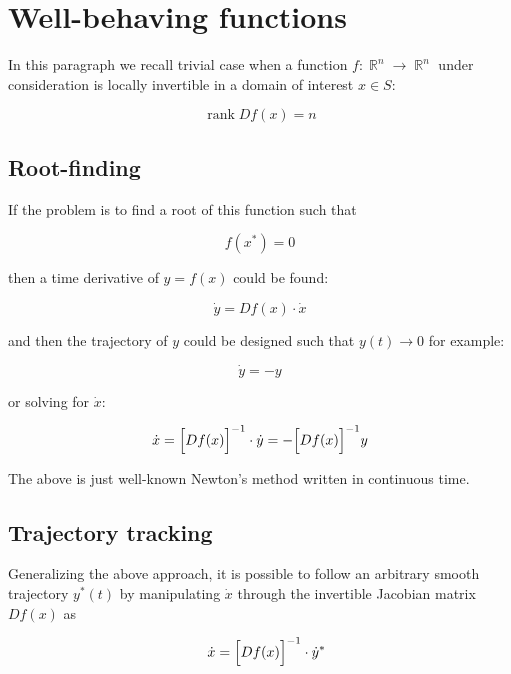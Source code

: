\documentclass[11pt,american]{article}
\DeclareMathOperator{\R}{\mathbb{R}}
\DeclareMathOperator{\rank}{\operatorname{rank}}
\begin{document}
\section{Well-behaving functions}

In this paragraph we recall trivial case when a function $f: \R^n \to \R^n$ under consideration is locally invertible in a domain of interest $x \in S$:

\begin{equation}
\rank D f(x) = n
\end{equation}

\subsection{Root-finding}

If the problem is to find a root of this function such that

\begin{equation}
f(x^*) = 0
\end{equation}

then a time derivative of $y = f(x)$ could be found:

\begin{equation}
\dot y = D f(x) \cdot \dot x
\end{equation}

and then the trajectory of $y$ could be designed such that $y(t) \to 0$ for example:

\begin{equation}
\dot y = -y
\end{equation}

or solving for $\dot x$:

\begin{equation}
\dot x = \Bigl[ D f(x) \Bigr]^{-1} \cdot \dot y = -\Bigl[ D f(x) \Bigr]^{-1} y
\end{equation}

The above is just well-known Newton's method written in continuous time.

\subsection{Trajectory tracking}

Generalizing the above approach, it is possible to follow an arbitrary smooth trajectory $y^*(t)$ by manipulating $\dot x$ through the invertible Jacobian matrix $D f(x)$ as 

\begin{equation}\label{newton_track}
\quad \dot x = \Bigl[ D f(x) \Bigr]^{-1} \cdot \dot y^*
\end{equation}
\end{document}
